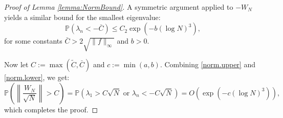 \documentclass[11pt, reqno]{amsart}
\numberwithin{equation}{section}
\begin{document}
\begin{proof}[Proof of Lemma \ref{lemma:NormBound}]
A symmetric argument applied to \( -W_N \) yields a similar bound for the smallest eigenvalue:
\begin{equation} \label{norm.lower}
\mathbb{P} \left( \lambda_n < -\bar{C} \right) \le C_2 \exp \left( -b (\log N)^3 \right),
\end{equation}
for some constants \( \bar{C} > 2\sqrt{\|f\|_\infty} \) and \( b > 0 \).

Now let \( C := \max(\tilde{C}, \bar{C}) \) and \( c := \min(a, b) \). Combining \eqref{norm.upper} and \eqref{norm.lower}, we get:
\[
\mathbb{P} \left( \left\| \frac{W_N}{\sqrt{N}} \right\| > C \right) 
= \mathbb{P} \left( \lambda_1 > C \sqrt{N} \,\, \text{or} \,\, \lambda_n < -C \sqrt{N} \right) 
= O\left( \exp(-c (\log N)^3) \right),
\]
which completes the proof.
\end{proof}
\end{document}
